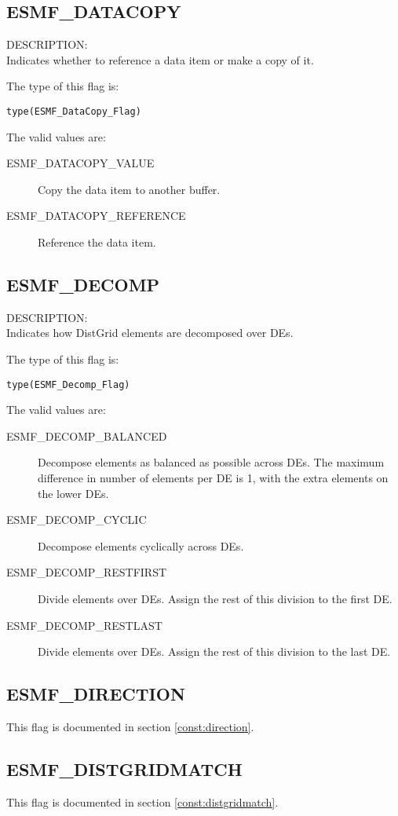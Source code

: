 \subsection{ESMF\_DATACOPY}
\label{const:datacopyflag}
{\sf DESCRIPTION:\\}
Indicates whether to reference a data item or make a copy of it.

The type of this flag is:

{\tt type(ESMF\_DataCopy\_Flag)}

The valid values are:
\begin{description}
\item [ESMF\_DATACOPY\_VALUE]
      Copy the data item to another buffer.
\item [ESMF\_DATACOPY\_REFERENCE]
      Reference the data item.
\end{description}

\subsection{ESMF\_DECOMP}
\label{const:decompflag}
{\sf DESCRIPTION:\\}
Indicates how DistGrid elements are decomposed over DEs.

The type of this flag is:

{\tt type(ESMF\_Decomp\_Flag)}

The valid values are:
\begin{description}
\item [ESMF\_DECOMP\_BALANCED]
      Decompose elements as balanced as possible across DEs. The maximum 
      difference in number of elements per DE is 1, with the extra elements on
      the lower DEs.
\item [ESMF\_DECOMP\_CYCLIC]
      Decompose elements cyclically across DEs.
\item [ESMF\_DECOMP\_RESTFIRST]
      Divide elements over DEs. Assign the rest of this division to the first
      DE.
\item [ESMF\_DECOMP\_RESTLAST]
       Divide elements over DEs. Assign the rest of this division to the last DE.
\end{description}

\subsection{ESMF\_DIRECTION}
This flag is documented in section \ref{const:direction}.

\subsection{ESMF\_DISTGRIDMATCH}
This flag is documented in section \ref{const:distgridmatch}.

